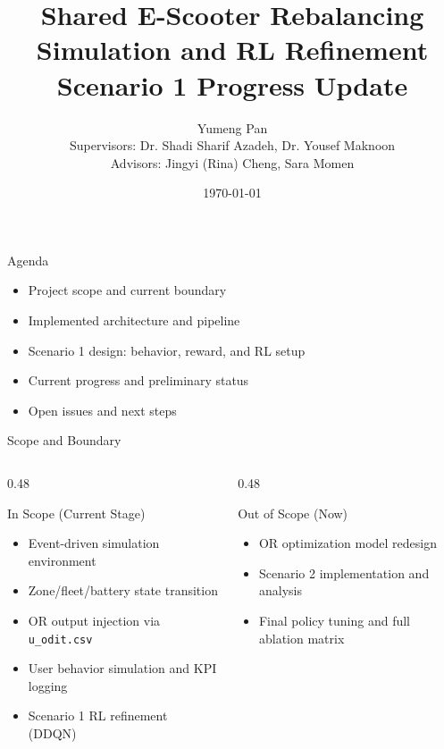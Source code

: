 ﻿\documentclass[aspectratio=169]{beamer}
\title[Scenario 1 Progress]{Shared E-Scooter Rebalancing Simulation and RL Refinement\\Scenario 1 Progress Update}
\author[Y. Pan]{Yumeng Pan\\[0.4em]\small Supervisors: Dr. Shadi Sharif Azadeh, Dr. Yousef Maknoon\\Advisors: Jingyi (Rina) Cheng, Sara Momen}
\institute[TU Delft]{Delft University of Technology\\Faculty of Civil Engineering and Geosciences}
\date{\today}
\newcommand{\tightlist}{\setlength{\itemsep}{4pt}\setlength{\parskip}{0pt}}
\begin{document}
\begin{frame}
  \titlepage
\end{frame}

\begin{frame}{Agenda}
\begin{itemize}\tightlist
  \item Project scope and current boundary
  \item Implemented architecture and pipeline
  \item Scenario 1 design: behavior, reward, and RL setup
  \item Current progress and preliminary status
  \item Open issues and next steps
\end{itemize}
\end{frame}

\begin{frame}{Scope and Boundary}
\begin{columns}[T,onlytextwidth]
\begin{column}{0.48\textwidth}
\begin{block}{In Scope (Current Stage)}
\begin{itemize}\tightlist
  \item Event-driven simulation environment
  \item Zone/fleet/battery state transition
  \item OR output injection via \texttt{u\_odit.csv}
  \item User behavior simulation and KPI logging
  \item Scenario 1 RL refinement (DDQN)
\end{itemize}
\end{block}
\end{column}
\begin{column}{0.48\textwidth}
\begin{alertblock}{Out of Scope (Now)}
\begin{itemize}\tightlist
  \item OR optimization model redesign
  \item Scenario 2 implementation and analysis
  \item Final policy tuning and full ablation matrix
\end{itemize}
\end{alertblock}
\end{column}
\end{columns}
\end{frame}
\end{document}
